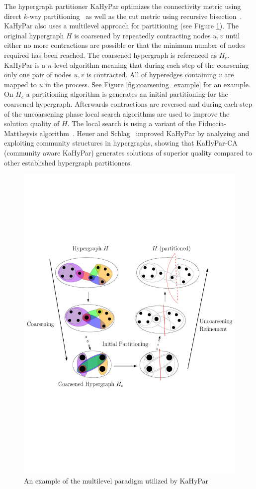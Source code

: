 \documentclass[a4paper,12pt,titlepage, BCOR7mm,headsepline]{scrbook}
\numberwithin{equation}{section}
\begin{document}
The hypergraph partitioner KaHyPar optimizes the connectivity metric using direct $k$-way partitioning~\cite{akhremtsev2017engineering} as well as the cut metric using recursive bisection~\cite{schlag2016k}.  
KaHyPar also uses a multilevel approach for partitioning (see Figure \ref{fig:coarseningexample}). The original hypergraph $H$ is coarsened by repeatedly contracting nodes $u,v$ until either no more contractions are possible or that the minimum number of nodes required has been reached. The coarsened hypergraph is referenced as $H_c$. KaHyPar is a $n$-level algorithm meaning that during each step of the coarsening only one pair of nodes $u, v$ is contracted. All of hyperedges containing $v$ are mapped to $u$ in the process. See Figure \ref{fig:coarsening_example} for an example. 
On $H_c$ a partitioning algorithm is generates an initial partitioning for the coarsened hypergraph. Afterwards contractions are reversed and 
during each step of the uncoarsening phase local search algorithms are used to improve the solution quality of $H$. The local search is using a variant of the Fiduccia-Mattheysis algorithm~\cite{fiduccia1988linear}. 
Heuer and Schlag~\cite{heuer2017improving} improved KaHyPar by analyzing and exploiting community structures in hypergraphs, showing that KaHyPar-CA (community aware KaHyPar) generates solutions of superior quality compared to other established hypergraph partitioners.
\newline
\begin{figure}[H] 
    \vspace*{-.25cm}
  \centering
   \includegraphics[width=.8\textwidth]{Ipe/Memetic_process.pdf}
  \caption{An example of the multilevel paradigm utilized by KaHyPar}\label{fig:coarseningexample} %

\end{figure}
\end{document}

